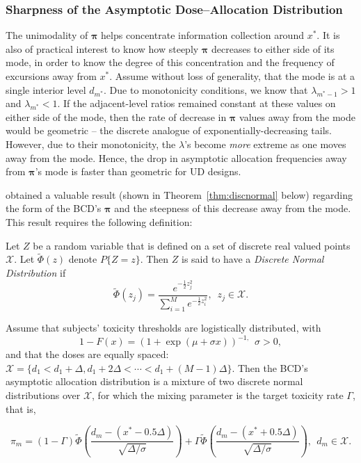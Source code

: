 \subsubsection{Sharpness of the Asymptotic Dose--Allocation Distribution}

The unimodality of $\boldsymbol{\pi}$ helps concentrate information collection around $x^*$. It is also of practical interest to know how steeply $\boldsymbol{\pi}$ decreases to either side of its mode, in order to know the degree of this concentration and the frequency of excursions away from $x^*$. Assume without loss of generality, that the mode is at a single interior level $d_{m^*}$. Due to monotonicity conditions, we know that $\lambda_{m^*-1}>1$ and $\lambda_{m^*}<1$. If the adjacent-level ratios remained constant at these values on either side of the mode, then the rate of decrease in $\boldsymbol{\pi}$ values away from the mode would be geometric -- the discrete analogue of exponentially-decreasing tails. However, due to their monotonicity, the $\lambda$'s become \emph{more} extreme as one moves away from the mode. Hence, the drop in asymptotic allocation frequencies away from $\boldsymbol{\pi}$'s mode is faster than geometric for UD designs.

\cite{Durh:Flou:rand:1994} obtained a valuable result (shown in Theorem~\ref{thm:discnormal} below) regarding the form of the BCD's $\boldsymbol{\pi}$ and the steepness of this decrease away from the mode. This result requires the following definition:
\begin{defn}
Let $Z$ be a random variable that is defined on a set of discrete
real valued points $\mathcal{X}$.  Let $\tilde{\Phi}(z)$ denote $P\{Z=z\}$.  Then $Z$ is said to have a \emph{Discrete Normal Distribution} if
\begin{equation*}
\tilde{\Phi}(z_j)=\frac{e^{-\frac{1}{2}z_j^2}}{\sum_{i=1}^Me^{-\frac{1}{2}z_i^2}},\,\,\,z_j\in\mathcal{X}.
\end{equation*}
\end{defn}
\begin{thm}\label{thm:discnormal}
Assume that subjects' toxicity thresholds are logistically distributed, with $$1-F(x)=(1+\exp(\mu+\sigma x))^{-1,}\ \ \sigma>0,$$ and that the doses are equally spaced: $\mathcal{X}=\{d_1<d_1+\Delta,d_1+2\Delta<\cdots<d_1+(M-1)\Delta\}.$ Then the BCD's asymptotic allocation distribution is a mixture of two discrete normal distributions over $\mathcal{X}$,  for which the mixing parameter is the target toxicity rate $\Gamma$, that is,

\begin{equation}\label{eq:discnormal}
\pi_m=(1-\Gamma)\tilde{\Phi}\left(\frac{d_m-(x^*-0.5\Delta)}{\sqrt{\Delta/\sigma}}\right)+
\Gamma\tilde{\Phi}\left(\frac{d_m-(x^*+0.5\Delta)}{\sqrt{\Delta/\sigma}}\right),\ \ d_m\in\mathcal{X}.
\end{equation}
\end{thm}

